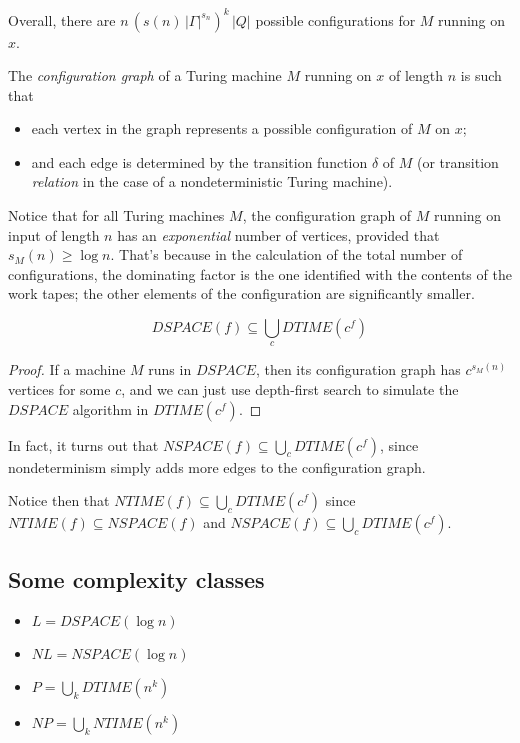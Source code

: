 Overall, there are $n\, (s(n)\, |\Gamma|^{s_n})^k\, |Q|$ possible
configurations for $M$ running on $x$.

\begin{definition}
    The \emph{configuration graph} of a Turing machine $M$ running on $x$ of
    length $n$ is such that
    \begin{itemize}
        \item
            each vertex in the graph represents a possible configuration of $M$
            on $x$;
        \item
            and each edge is determined by the transition function $\delta$ of
            $M$ (or transition \emph{relation} in the case of a
            nondeterministic Turing machine).
    \end{itemize}
\end{definition}

Notice that for all Turing machines $M$, the configuration graph of $M$ running
on input of length $n$ has an \emph{exponential} number of vertices, provided
that $s_M(n) \geq \log n$. That's because in the calculation of the total
number of configurations, the dominating factor is the one identified with the
contents of the work tapes; the other elements of the configuration are
significantly smaller.

\begin{proposition}
    $$
    DSPACE(f) \subseteq \bigcup_c DTIME(c^f)
    $$
\end{proposition}

\begin{proof}
    If a machine $M$ runs in $DSPACE$, then its configuration graph has
    $c^{s_M(n)}$ vertices for some $c$, and we can just use depth-first search
    to simulate the $DSPACE$ algorithm in $DTIME(c^f)$.
\end{proof}

In fact, it turns out that $NSPACE(f) \subseteq \bigcup_c DTIME(c^f)$, since
nondeterminism simply adds more edges to the configuration graph.

Notice then that $NTIME(f) \subseteq \bigcup_c DTIME(c^f)$ since $NTIME(f)
\subseteq NSPACE(f)$ and $NSPACE(f) \subseteq \bigcup_c DTIME(c^f)$.

\subsection{Some complexity classes}

\begin{itemize}
    \item $L = DSPACE(\log n)$
    \item $NL = NSPACE(\log n)$
    \item $P = \bigcup_k DTIME(n^k)$
    \item $NP = \bigcup_k NTIME(n^k)$
\end{itemize}

